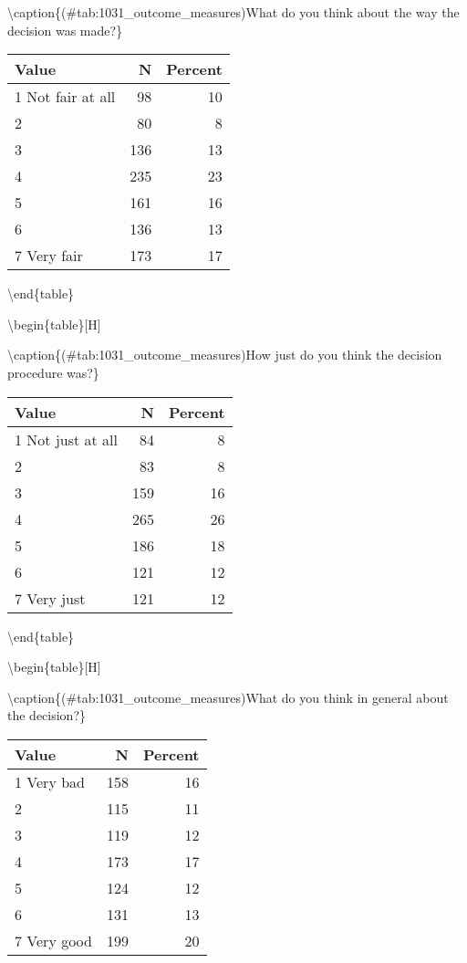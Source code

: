 \documentclass[
]{book}
\begin{document}
\textbackslash caption\{(\#tab:1031\_outcome\_measures)What do you think about the way the decision was made?\}
\centering

\begin{tabular}[t]{lrr}
\toprule
Value & N & Percent\\
\midrule
1 Not fair at all & 98 & 10\\
2 & 80 & 8\\
3 & 136 & 13\\
4 & 235 & 23\\
5 & 161 & 16\\
6 & 136 & 13\\
7 Very fair & 173 & 17\\
\bottomrule
\end{tabular}

\textbackslash end\{table\}

\textbackslash begin\{table\}{[}H{]}

\textbackslash caption\{(\#tab:1031\_outcome\_measures)How just do you think the decision procedure was?\}
\centering

\begin{tabular}[t]{lrr}
\toprule
Value & N & Percent\\
\midrule
1 Not just at all & 84 & 8\\
2 & 83 & 8\\
3 & 159 & 16\\
4 & 265 & 26\\
5 & 186 & 18\\
6 & 121 & 12\\
7 Very just & 121 & 12\\
\bottomrule
\end{tabular}

\textbackslash end\{table\}

\textbackslash begin\{table\}{[}H{]}

\textbackslash caption\{(\#tab:1031\_outcome\_measures)What do you think in general about the decision?\}
\centering

\begin{tabular}[t]{lrr}
\toprule
Value & N & Percent\\
\midrule
1 Very bad & 158 & 16\\
2 & 115 & 11\\
3 & 119 & 12\\
4 & 173 & 17\\
5 & 124 & 12\\
6 & 131 & 13\\
7 Very good & 199 & 20\\
\bottomrule
\end{tabular}
\end{document}
